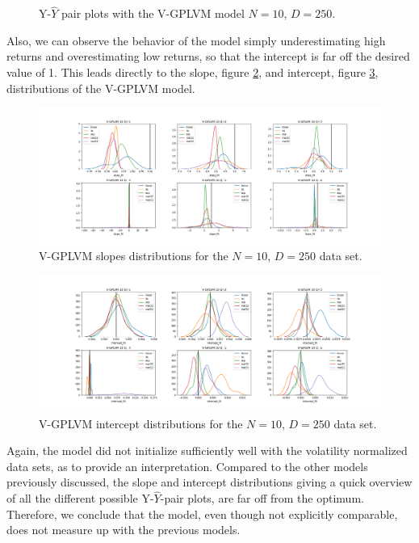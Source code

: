 \begin{figure}[b]
\begin{subfigure}[r]{0.3\textwidth}
	\end{subfigure}
	\caption[Y-$\hat{Y}$ pair plots V-GPLVM model]{Y-$\hat{Y}$ pair plots with the V-GPLVM model $N=10$, $D=250$.}
	\label{fig:vola_N10_pairs}
\end{figure}
Also, we can observe the behavior of the model simply underestimating high returns and overestimating low returns, so that the intercept is far off the desired value of 1. This leads directly to the slope, figure \ref{fig:vola_slopes}, and intercept, figure \ref{fig:vola_intercepts}, distributions of the V-GPLVM model. 
\begin{figure}[t]%
	\centering
	\includegraphics[width=7in]{img/07_2/slope_fit_vola_elbo.png}
	\caption[V-GPLVM slopes distributions]{V-GPLVM slopes distributions for the $N=10$, $D=250$ data set.}
	\label{fig:vola_slopes}
\end{figure}
\begin{figure}[b]%
	\centering
	\includegraphics[width=7in]{img/07_2/intercept_fit_vola_elbo.png}
	\caption[V-GPLVM intercepts distributions]{V-GPLVM intercept distributions for the $N=10$, $D=250$ data set.}
	\label{fig:vola_intercepts}
\end{figure}
Again, the model did not initialize sufficiently well with the volatility normalized data sets, as to provide an interpretation. Compared to the other models previously discussed, the slope and intercept distributions giving a quick overview of all the different possible Y-$\hat{Y}$-pair plots, are far off from the optimum. Therefore, we conclude that the model, even though not explicitly comparable, does not measure up with the previous models. 